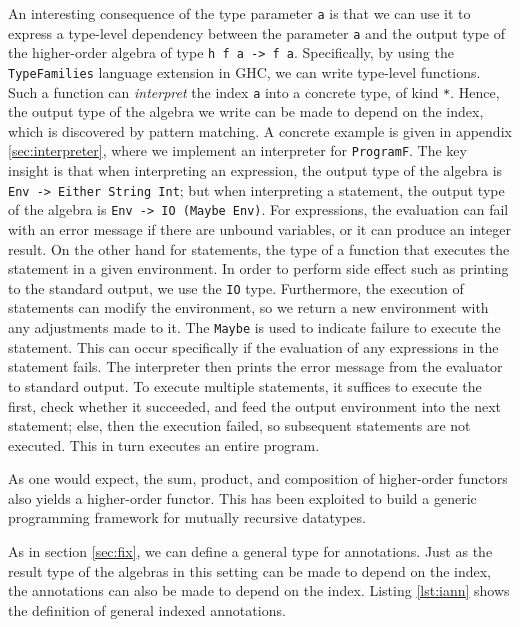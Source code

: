 \documentclass[letterpaper,11pt]{article}
\newcommand{\code}{\texttt}
\begin{document}
An interesting consequence of the type parameter \code{a} is that we can use it
to express a type-level dependency between the parameter \code{a} and the
output type of the higher-order algebra of type \code{h f a -> f a}.
Specifically, by using the \code{TypeFamilies} language extension in GHC, we
can write type-level functions. Such a function can \emph{interpret} the index
\code{a} into a concrete type, of kind \code{*}. Hence, the output type of the
algebra we write can be made to depend on the index, which is discovered by
pattern matching. A concrete example is given in appendix
\ref{sec:interpreter}, where we implement an interpreter for \code{ProgramF}.
The key insight is that when interpreting an expression, the output type of the
algebra is \code{Env -> Either String Int}; but when interpreting a statement,
the output type of the algebra is \code{Env -> IO (Maybe Env)}. For
expressions, the evaluation can fail with an error message if there are unbound
variables, or it can produce an integer result. On the other hand for
statements, the type of a function that executes the statement in a given
environment. In order to perform side effect such as printing to the standard
output, we use the \code{IO} type. Furthermore, the execution of statements can
modify the environment, so we return a new environment with any adjustments
made to it.  The \code{Maybe} is used to indicate failure to execute the
statement. This can occur specifically if the evaluation of any expressions in
the statement fails.  The interpreter then prints the error message from the
evaluator to standard output. To execute multiple statements, it suffices to
execute the first, check whether it succeeded, and feed the output environment
into the next statement; else, then the execution failed, so subsequent
statements are not executed.  This in turn executes an entire program.

As one would expect, the sum, product, and composition of higher-order functors
also yields a higher-order functor. This has been exploited to build a generic
programming framework for mutually recursive datatypes\cite{multirec}.

As in section \ref{sec:fix}, we can define a general type for annotations. Just
as the result type of the algebras in this setting can be made to depend on the
index, the annotations can also be made to depend on the index. Listing
\ref{lst:iann} shows the definition of general indexed annotations.
\end{document}
